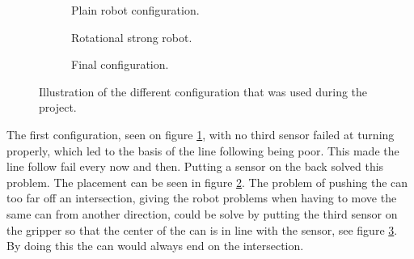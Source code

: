\begin{figure}[H]
 \begin{subfigure}{0.32\textwidth}
 \centering
  \caption{Plain robot configuration.}
  \label{subfig:plain_robot}
 \end{subfigure}
 \begin{subfigure}{0.32\textwidth}
 \centering
  \caption{Rotational strong robot.}
  \label{subfig:rot_robot}
 \end{subfigure}
 \begin{subfigure}{0.32\textwidth}
 \centering
  \caption{Final configuration.}
  \label{subfig:final_robot}
 \end{subfigure}
\caption{Illustration of the different configuration that was used during the project.}
\label{fig:line_follow}
\end{figure}

The first configuration, seen on figure \ref{subfig:plain_robot}, with no third sensor failed at turning properly, which led to the basis of the line following being poor. This made the line follow fail every now and then. Putting a sensor on the back solved this problem. The placement can be seen in figure \ref{subfig:rot_robot}. The problem of pushing the can too far off an intersection, giving the robot problems when having to move the same can from another direction, could be solve by putting the third sensor on the gripper so that the center of the can is in line with the sensor, see figure \ref{subfig:final_robot}. By doing this the can would always end on the intersection. 

